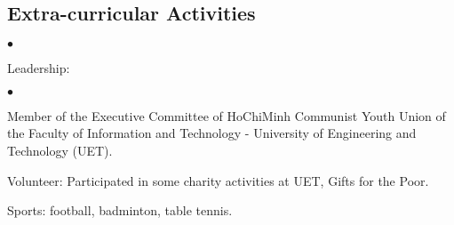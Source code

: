 \documentclass[margin,line]{res}
\newenvironment{list2}{
  \begin{list}{$\bullet$}{%
      \setlength{\itemsep}{0in}
      \setlength{\parsep}{0in} \setlength{\parskip}{0in}
      \setlength{\topsep}{0in} \setlength{\partopsep}{0in}
      \setlength{\leftmargin}{0.2in}}}{\end{list}}
\begin{document}
\begin{resume}
\section{\sc Extra-curricular Activities}
\begin{list2}
\item Leadership:
\begin{list2}
\item Member of the Executive Committee of HoChiMinh Communist Youth Union of the Faculty of Information and Technology - University of Engineering and Technology (UET).
\vspace{1em}
\end{list2}
\item Volunteer: Participated in some charity activities at UET, Gifts for the Poor.
\vspace{1em}
\item Sports: football, badminton, table tennis.
\end{list2}
%

\end{resume}
\end{document}
